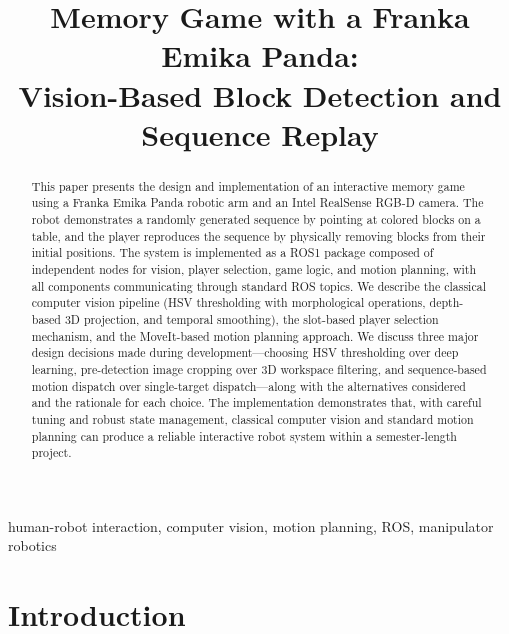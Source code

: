 \documentclass[conference]{IEEEtran}
\begin{document}
\title{Memory Game with a Franka Emika Panda:\\
Vision-Based Block Detection and Sequence Replay}

\author{
}

\maketitle

\begin{abstract}
This paper presents the design and implementation of an interactive
memory game using a Franka Emika Panda robotic arm and an Intel RealSense
RGB-D camera. The robot demonstrates a randomly generated sequence by
pointing at colored blocks on a table, and the player reproduces the
sequence by physically removing blocks from their initial positions. The
system is implemented as a ROS1 package composed of independent nodes for
vision, player selection, game logic, and motion planning, with all
components communicating through standard ROS topics. We describe the
classical computer vision pipeline (HSV thresholding with morphological
operations, depth-based 3D projection, and temporal smoothing), the
slot-based player selection mechanism, and the MoveIt-based motion
planning approach. We discuss three major design decisions made during
development---choosing HSV thresholding over deep learning, pre-detection
image cropping over 3D workspace filtering, and sequence-based motion
dispatch over single-target dispatch---along with the alternatives
considered and the rationale for each choice. The implementation
demonstrates that, with careful tuning and robust state management,
classical computer vision and standard motion planning can produce a
reliable interactive robot system within a semester-length project.
\end{abstract}

\begin{IEEEkeywords}
human-robot interaction, computer vision, motion planning, ROS,
manipulator robotics
\end{IEEEkeywords}

\section{Introduction}
\end{document}
